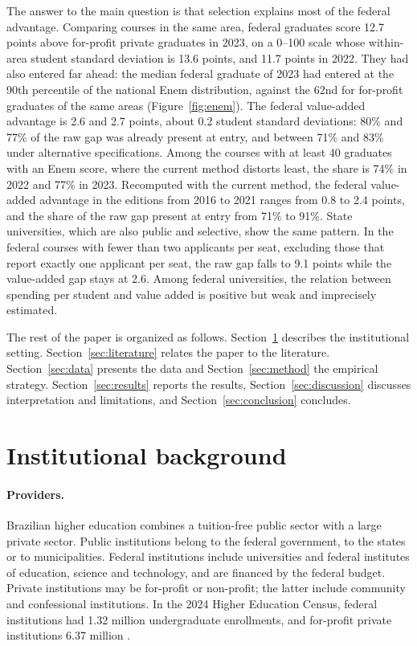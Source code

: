 \documentclass[11pt,a4paper]{article}
\begin{document}
The answer to the main question is that selection explains most of the federal advantage. Comparing courses in the same area, federal graduates score 12.7 points above for-profit private graduates in 2023, on a 0--100 scale whose within-area student standard deviation is 13.6 points, and 11.7 points in 2022. They had also entered far ahead: the median federal graduate of 2023 had entered at the 90th percentile of the national Enem distribution, against the 62nd for for-profit graduates of the same areas (Figure~\ref{fig:enem}). The federal value-added advantage is 2.6 and 2.7 points, about 0.2 student standard deviations: 80\% and 77\% of the raw gap was already present at entry, and between 71\% and 83\% under alternative specifications. Among the courses with at least 40 graduates with an Enem score, where the current method distorts least, the share is 74\% in 2022 and 77\% in 2023. Recomputed with the current method, the federal value-added advantage in the editions from 2016 to 2021 ranges from 0.8 to 2.4 points, and the share of the raw gap present at entry from 71\% to 91\%. State universities, which are also public and selective, show the same pattern. In the federal courses with fewer than two applicants per seat, excluding those that report exactly one applicant per seat, the raw gap falls to 9.1 points while the value-added gap stays at 2.6. Among federal universities, the relation between spending per student and value added is positive but weak and imprecisely estimated.

The rest of the paper is organized as follows. Section~\ref{sec:background} describes the institutional setting. Section~\ref{sec:literature} relates the paper to the literature. Section~\ref{sec:data} presents the data and Section~\ref{sec:method} the empirical strategy. Section~\ref{sec:results} reports the results, Section~\ref{sec:discussion} discusses interpretation and limitations, and Section~\ref{sec:conclusion} concludes.

\section{Institutional background}\label{sec:background}

\paragraph{Providers.} Brazilian higher education combines a tuition-free public sector with a large private sector. Public institutions belong to the federal government, to the states or to municipalities. Federal institutions include universities and federal institutes of education, science and technology, and are financed by the federal budget. Private institutions may be for-profit or non-profit; the latter include community and confessional institutions. In the 2024 Higher Education Census, federal institutions had 1.32 million undergraduate enrollments, and for-profit private institutions 6.37 million \citep{inepcenso}.
\end{document}
